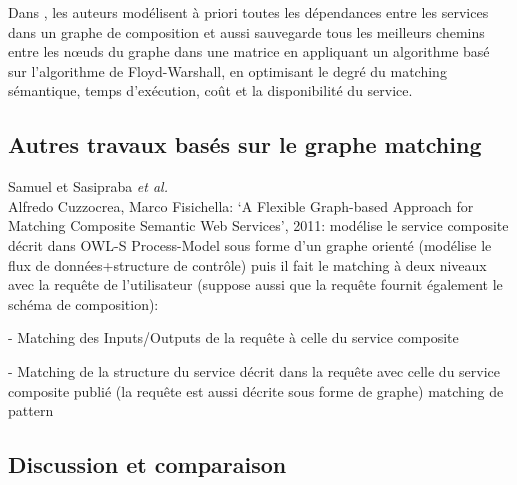   \begin{text}
    Dans \cite{elmaghraoui2011graph}, les auteurs modélisent à priori
    toutes les dépendances entre les services dans un graphe de
    composition et aussi sauvegarde tous les meilleurs chemins entre
    les nœuds du graphe dans une matrice en appliquant un algorithme
    basé sur l'algorithme de Floyd-Warshall, en optimisant le degré du
    matching sémantique, temps d'exécution, coût et la disponibilité
    du service.
  \end{text}

  \subsection{Autres travaux basés sur le graphe matching}
  \label{sec:autres-travaux}
  \begin{text}
  Samuel et Sasipraba \textit{et al.} \cite{samuel2011approach}\\

  Alfredo Cuzzocrea, Marco Fisichella: ‘A Flexible Graph-based
  Approach for Matching Composite Semantic Web Services’, 2011:
  modélise le service composite décrit dans OWL-S Process-Model sous
  forme d’un graphe orienté (modélise le flux de données+structure de
  contrôle) puis il fait le matching à deux niveaux avec la requête de
  l’utilisateur (suppose aussi que la requête fournit également le
  schéma de composition):

  - Matching des Inputs/Outputs de la requête à celle du service
  composite

  - Matching de la structure du service décrit dans la requête avec
  celle du service composite publié (la requête est aussi décrite sous
  forme de graphe) matching de pattern
  \end{text}
  \newpage
  \subsection{Discussion et comparaison}
  \label{sec:discussion-comparaison}
  

\newpage
